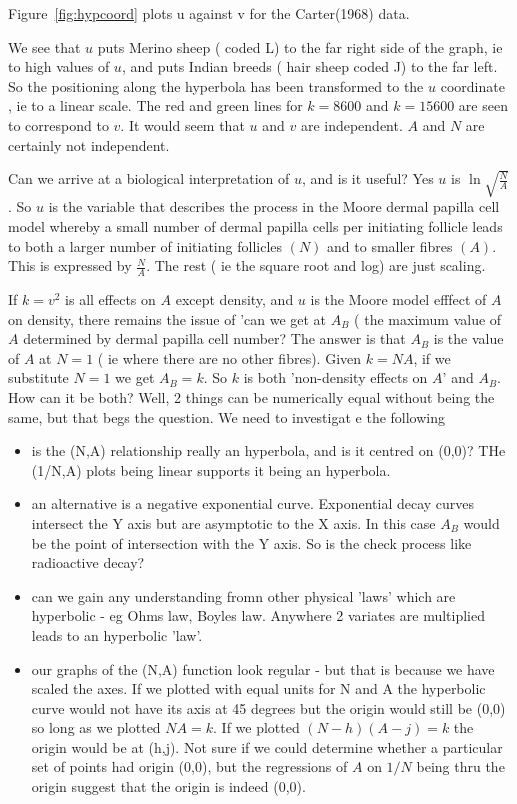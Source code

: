 \documentclass[titlepage]{article}  %
\begin{document}
Figure~\ref{fig:hypcoord} plots u against v for the Carter(1968) data.

We see that $u$ puts Merino sheep ( coded L) to the far right side of the graph, ie to high values of $u$, and puts Indian breeds ( hair sheep coded J) to the far left. So the positioning along the hyperbola has been transformed to the $u$ coordinate , ie to a linear scale. The red and green lines for $k=8600$ and $k=15600$ are seen to correspond to $v$. It would seem that $u$ and $v$ are independent. $A$ and $N$ are certainly not independent.

Can we arrive at a biological interpretation of $u$, and is it useful? Yes $u$ is $\ln{\sqrt{\frac{N}{A}}}$. So $u$ is the variable that describes the process in the Moore dermal papilla cell model whereby a small number of dermal papilla cells per initiating follicle leads to both a larger number of initiating follicles $(N)$ and to smaller fibres $(A)$. This is expressed by $\frac{N}{A}$. The rest ( ie the square root and log) are just scaling. 

If $k=v^{2}$ is all effects on $A$ except density, and $u$ is the  Moore model efffect of $A$ on density, there remains the issue of 'can we get at $A_{B}$ ( the maximum value of $A$ determined by dermal papilla cell number? The answer is that $A_{B}$ is the value of $A$ at $N=1$ ( ie where there are no other fibres).  Given $k = N A$, if we substitute $N=1$ we get $A_{B} = k$. So $k$ is both 'non-density effects on $A$' and $A_{B}$. How can it be both? Well, 2 things can be numerically equal without being the same, but that begs the question. We need to investigat e the following
\begin{itemize}
\item is the (N,A) relationship really an hyperbola, and is it centred on (0,0)? THe (1/N,A) plots being linear supports it being an hyperbola. 
\item an alternative is a negative exponential curve. Exponential decay curves intersect the Y axis but are asymptotic to the X axis. In this case $A_{B}$ would be the point of intersection with the Y axis. So is the check process like radioactive decay?
\item can we gain any understanding fromn other physical 'laws' which are hyperbolic - eg Ohms law, Boyles law. Anywhere 2 variates are multiplied leads to an hyperbolic 'law'. 
\item our graphs of the (N,A) function look regular - but that is because we have scaled the axes. If we plotted with equal units for N and A the hyperbolic curve would not have its axis at 45 degrees but the origin would still be (0,0) so long as we plotted $N A = k$. If we plotted $(N-h) (A-j) = k$ the origin would be at (h,j). Not sure if we could determine whether a particular set of points had origin (0,0), but the regressions of $A$ on $1/N$ being thru the origin suggest that the origin is indeed (0,0).

\end{itemize}
\end{document}
